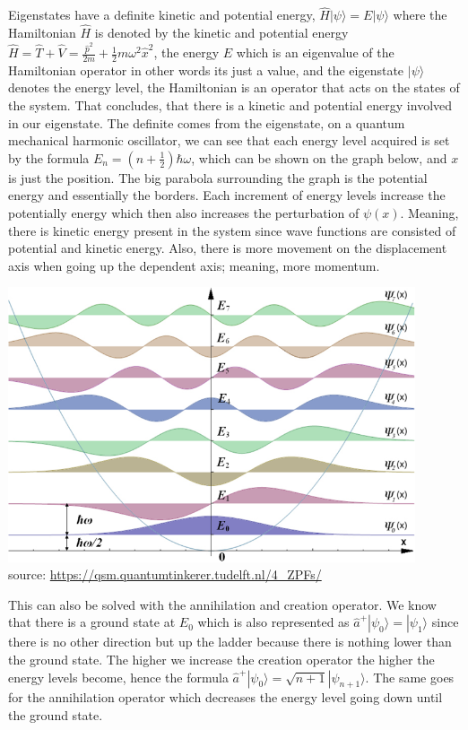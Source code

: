 \documentclass[11pt]{article}
\def\h{\hbar}
\def\w{\omega}
\def\ra{\rangle}
\renewcommand{\hat}{\widehat}
\theoremstyle{pink}
\theoremstyle{boxedsolution}
\theoremstyle{definition}
\theoremstyle{claim}
\begin{document}
Eigenstates have a definite kinetic and potential energy, $\hat{H}|\psi\ra=E|\psi\ra$ where the Hamiltonian $\hat{H}$ is denoted by the kinetic and potential energy $\hat{H}=\hat{T}+\hat{V}=\frac{\hat{p}^2}{2m}+\frac{1}{2}m\w^2\hat{x}^2$, the energy $E$ which is an eigenvalue of the Hamiltonian operator in other words its just a value, and the eigenstate $|\psi\ra$ denotes the energy level, the Hamiltonian is an operator that acts on the states of the system. That concludes, that there is a kinetic and potential energy involved in our eigenstate. The definite comes from the eigenstate, on a quantum mechanical harmonic oscillator, we can see that each energy level acquired is set by the formula $E_n=(n+\frac{1}{2})\h\w$, which can be shown on the graph below, and $x$ is just the position. The big parabola surrounding the graph is the potential energy and essentially the borders. Each increment of energy levels increase the potentially energy which then also increases the perturbation of $\psi(x)$. Meaning, there is kinetic energy present in the system since wave functions are consisted of potential and kinetic energy. Also, there is more movement on the displacement axis when going up the dependent axis; meaning, more momentum. 
\begin{center}
    \includegraphics[width=12cm]{harmosc.png}\\
    source: \url{https://qsm.quantumtinkerer.tudelft.nl/4_ZPFs/}
\end{center}
This can also be solved with the annihilation and creation operator. We know that there is a ground state at $E_0$ which is also represented as $\hat{a}^+|\psi_0\ra=|\psi_{1}\ra$ since there is no other direction but up the ladder because there is nothing lower than the ground state. The higher we increase the creation operator the higher the energy levels become, hence the formula $\hat{a}^+|\psi_0\ra=\sqrt{n+1}|\psi_{n+1}\ra$. The same goes for the annihilation operator which decreases the energy level going down until the ground state.
\newpage
\end{document}
